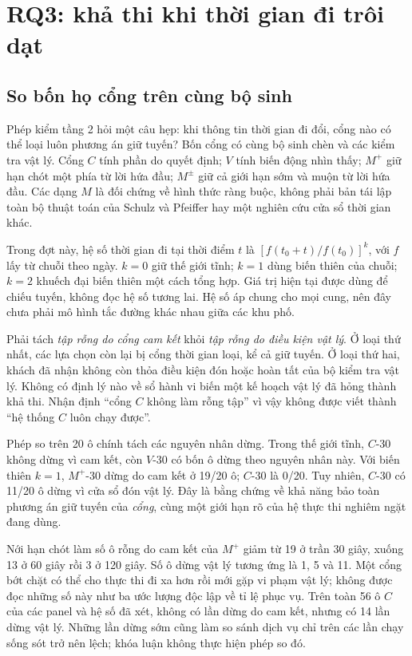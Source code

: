 \section{RQ3: khả thi khi thời gian đi trôi dạt}

\label{muc:trongdiem}

\subsection{So bốn họ cổng trên cùng bộ sinh}

Phép kiểm tầng 2 hỏi một câu hẹp: khi thông tin thời gian đi đổi, cổng nào có thể loại
luôn phương án giữ tuyến? Bốn cổng có cùng bộ sinh chèn và các kiểm tra vật lý. Cổng
$C$ tính phần do quyết định; $V$ tính biến động nhìn thấy; $M^{+}$ giữ hạn chót một
phía từ lời hứa đầu; $M^{\pm}$ giữ cả giới hạn sớm và muộn từ lời hứa đầu. Các dạng
$M$ là đối chứng về hình thức ràng buộc, không phải bản tái lập toàn bộ thuật toán
của Schulz và Pfeiffer hay một nghiên cứu cửa sổ thời gian khác.

Trong đợt này, hệ số thời gian đi tại thời điểm $t$ là
$[f(t_0+t)/f(t_0)]^k$, với $f$ lấy từ chuỗi theo ngày. $k=0$ giữ thế giới tĩnh;
$k=1$ dùng biến thiên của chuỗi; $k=2$ khuếch đại biến thiên một cách tổng hợp.
Giá trị hiện tại được dùng để chiếu tuyến, không đọc hệ số tương lai. Hệ số áp chung
cho mọi cung, nên đây chưa phải mô hình tắc đường khác nhau giữa các khu phố.

Phải tách \emph{tập rỗng do cổng cam kết} khỏi \emph{tập rỗng do điều kiện vật lý}.
Ở loại thứ nhất, các lựa chọn còn lại bị cổng thời gian loại, kể cả giữ tuyến.
Ở loại thứ hai, khách đã nhận không còn thỏa điều kiện đón hoặc hoàn tất của bộ
kiểm tra vật lý. Không có định lý nào về sổ hành vi biến một kế hoạch vật lý đã
hỏng thành khả thi. Nhận định ``cổng $C$ không làm rỗng tập'' vì vậy không được
viết thành ``hệ thống $C$ luôn chạy được''.

Phép so trên 20 ô chính tách các nguyên nhân dừng. Trong thế giới
tĩnh, $C$-30 không dừng vì cam kết, còn $V$-30 có bốn ô dừng theo nguyên nhân này.
Với biến thiên $k=1$, $M^{+}$-30 dừng do cam kết ở 19/20 ô; $C$-30 là 0/20.
Tuy nhiên, $C$-30 có 11/20 ô dừng vì cửa sổ đón vật lý. Đây là bằng chứng về
khả năng bảo toàn phương án giữ tuyến của \emph{cổng}, cùng một giới hạn rõ của
hệ thực thi nghiêm ngặt đang dùng.

Nới hạn chót làm số ô rỗng do cam kết của $M^{+}$ giảm từ 19 ở trần 30 giây,
xuống 13 ở 60 giây rồi 3 ở 120 giây. Số ô dừng vật lý tương ứng là 1, 5 và 11.
Một cổng bớt chặt có thể cho thực thi đi xa hơn rồi mới gặp vi phạm vật lý;
không được đọc những số này như ba ước lượng độc lập về tỉ lệ phục vụ.
Trên toàn 56 ô $C$ của các panel và hệ số đã xét, không có lần dừng do cam kết,
nhưng có 14 lần dừng vật lý. Những lần dừng sớm cũng làm so sánh dịch vụ chỉ trên
các lần chạy sống sót trở nên lệch; khóa luận không thực hiện phép so đó.

